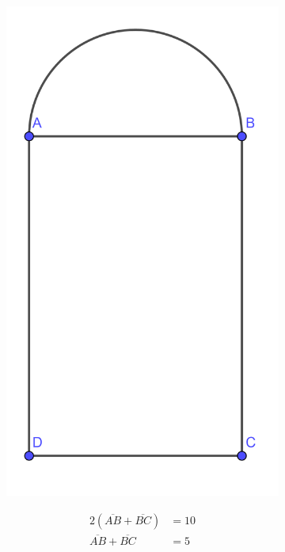 \documentclass[paper=a4, fontsize=11pt]{scrartcl}
\begin{document}
\begin{figure}[h!]
    \centering
    \begin{figure}
        \includegraphics{MathExamReview/8-window.png}
    \end{figure}    
    \begin{align*}
        2(\overline{AB}+\overline{BC})&=10\\
        \overline{AB}+\overline{BC}&=5\\

\end{align*}
\end{figure}
\end{document}
